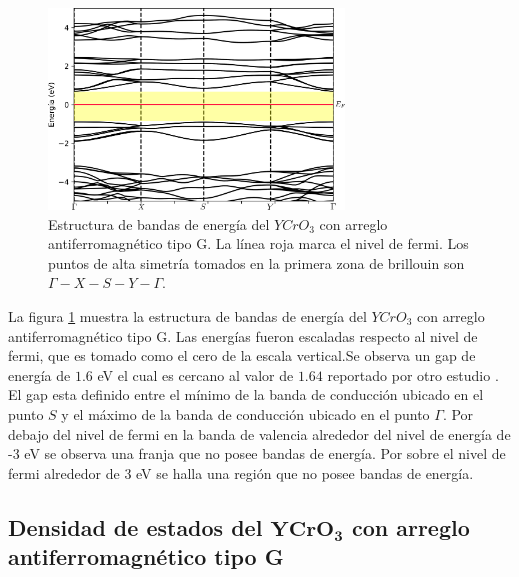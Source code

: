 
\begin{figure}[H]
	\centering
	\includegraphics[width=0.7\textwidth]{contenido/resultados/cromita_itrio/img_cromita_itrio/YCrO3_bandas_G_inf.png}
	\singlespace
	\caption[Bandas de energ\'ia del $YCrO_{3}$ con arreglo 
	antiferromagn\'etico tipo G]{Estructura de bandas de energ\'ia del 
	$YCrO_{3}$ con arreglo antiferromagn\'etico tipo G. La l\'inea roja marca 
	el 
	nivel de fermi. Los puntos de alta simetr\'ia tomados en la primera zona de 
	brillouin son $\Gamma - X - S - Y - \Gamma$.}
	\label{yco_band_g}
\end{figure}


La figura \ref{yco_band_g} muestra la estructura de bandas de energ\'ia del 
$YCrO_{3}$ con arreglo antiferromagn\'etico tipo G.  Las energ\'ias 
fueron escaladas 
respecto al nivel de fermi, que es tomado como el cero de la escala 
vertical.Se observa un gap de 
energ\'ia de $1.6$ eV el cual es cercano al valor de $1.64$ reportado por otro 
estudio \cite{nair2013}. El gap esta definido entre el m\'inimo de la banda de 
conducci\'on ubicado en el punto $S$ 
y el m\'aximo de la banda de conducci\'on ubicado en el punto 
$\Gamma$. Por debajo 
del nivel de fermi en la banda de valencia 
alrededor del nivel de energ\'ia de -3 eV se observa una franja que no 
posee bandas de energ\'ia. Por sobre el nivel de fermi alrededor de 3 
eV se halla una regi\'on que no posee bandas de energ\'ia.


\subsection{Densidad de estados del $\mathbf{YCrO_{3}}$ con arreglo      
    antiferromagn\'etico tipo G}


